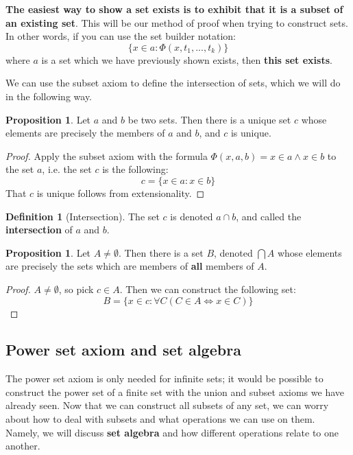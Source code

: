 \documentclass[11pt, oneside]{article}   	%
\theoremstyle{definition}
\newtheorem{definition}{Definition}[section]
\newtheorem{prop}[theorem]{Proposition}
\begin{document}
\textbf{The easiest way to show a set exists is to exhibit that it is a subset of an existing set}. This will be our method of proof 
when trying to construct sets. In other words, if you can use the set builder notation:
\begin{equation}
	\{x\in a : \Phi(x, t_1, ..., t_k)\}
\end{equation}
where $a$ is a set which we have previously shown exists, then \textbf{this set exists}. 

We can use the subset axiom to define the intersection of sets, which we will do in the following way. 
\begin{prop}
	Let $a$ and $b$ be two sets. Then there is a unique set $c$ whose elements are precisely the members of $a$ and $b$, 
	and $c$ is unique.
\end{prop}
\begin{proof}
	Apply the subset axiom with the formula $\Phi(x, a, b) = x\in a\wedge x\in b$ to the set $a$, i.e. the set $c$ is the 
	following:
	$$
		c = \{x\in a : x\in b\}
	$$
	That $c$ is unique follows from extensionality.
\end{proof}
\begin{definition}[Intersection]
	The set $c$ is denoted $a\cap b$, and called the \textbf{intersection} of $a$ and $b$. 
\end{definition}

\begin{prop}
	Let $A\neq\emptyset$. Then there is a set $B$, denoted $\bigcap A$ whose elements are precisely the sets which are 
	members of \textbf{all} members of $A$.
\end{prop}
\begin{proof}
	$A\neq\emptyset$, so pick $c\in A$. Then we can construct the following set:
	$$
		B = \{x\in c : \forall C (C\in A\iff x\in C)\}
	$$
\end{proof}

\subsection{Power set axiom and set algebra}

The power set axiom is only needed for infinite sets; it would be possible to construct the power set of a finite set with 
the union and subset axioms we have already seen. Now that we can construct all subsets of any set, we can worry about 
how to deal with subsets and what operations we can use on them. Namely, we will discuss \textbf{set algebra} and how 
different operations relate to one another.
\end{document}
